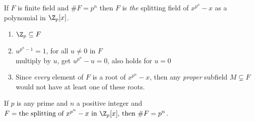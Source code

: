 \prop If $F$ is finite field and $\#F=p^n$ then $F$ is \emph{the} splitting field of $x^{p^n}-x$ as a polynomial in $\Z_p[x]$. \\
\pf\begin{enumerate}[label=\arabic*)]
\item $\Z_p\subseteq F$
\item $u^{p^n-1}=1$, for all $u\neq0$ in $F$ \\
multiply by $u$, get $u^{p^n}-u=0$, also holds for $u=0$
\item Since \emph{every} element of $F$ is a root of $x^{p^n}-x$, then any \emph{proper} subfield $M\subsetneq F$ would not have at least one of these roots.
\end{enumerate}

\prop If $p$ is any prime and $n$ a positive integer and $F=\text{the splitting of $x^{p^n}-x$ in $\Z_p[x]$, then $\#F=p^n$}$.
